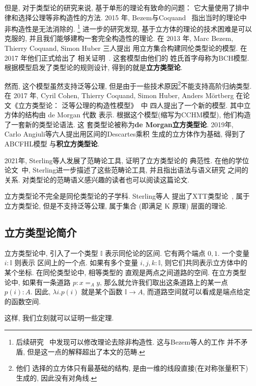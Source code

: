 但是, 对于类型论的研究来说, 基于单形的理论有致命的问题：
它大量使用了排中律和选择公理等非构造性的方法. 2015
年, Bezem与Coquand~\cite{bezem:2015:simplicial}
指出当时的理论中非构造性是无法消除的.%
\footnote{后续研究~\cite{henry:2019:constructive}
中发现可以修改理论去除非构造性. 这与Bezem等人的工作
并不矛盾, 但是这一点的解释超出了本文的范畴.}
进一步的研究发现, 基于立方体的理论的技术困难是可以克服的,
并且我们能够建构一套完全构造性的理论. 在 2013 年,
Marc Bezem, Thierry Coquand, Simon Huber 三人提出
用立方集合构建同伦类型论的模型. 在 2017 年他们正式给出了
相关证明~\cite{bch:2017:cubical}. 这套模型由他们的
姓氏首字母称为BCH模型. 根据模型启发了类型论的规则设计,
得到的就是\textbf{立方类型论}.

然而, 这个模型虽然支持泛等公理, 但是由于一些技术原因\footnote{他们
选择的立方体只有最基础的结构, 是由一维的线段直接(在对称张量积下)生成的,
因此没有对角线.}不能支持高阶归纳类型. 在 2017 年,
Cyril Cohen, Thierry Coquand, Simon Huber, Anders M\"ortberg
在论文《立方类型论： 泛等公理的构造性模型》~\cite{abcfhl:2021:cubical}中
四人提出了一个新的模型. 其中立方体的结构由 de Morgan 代数
表示. 根据这个模型(缩写为CCHM模型), 他们构造了一套新的类型论语法. 这
套类型论被称为\textbf{de Morgan立方类型论}.
2019年, Carlo Angiuli等六人提出用区间的Descartes乘积
生成的立方体作为基础, 得到了ABCFHL模型
与\textbf{积立方类型论}.

2021年, Sterling等人发展了范畴论工具, 证明了立方类型论的
典范性. 在他的学位论文~\cite{sterling:2021:thesis}中,
Sterling进一步描述了这些范畴论工具, 并且指出语法与语义研究
之间的关系. 对类型论的范畴语义感兴趣的读者也可以阅读这篇论文.

立方类型论不完全是同伦类型论的子学科. Sterling等人
提出了XTT类型论~\cite{sterling:2019:xtt}, 属于立方类型论,
但是不支持泛等公理, 属于集合 (即满足 K 原理) 层面的理论.

\subsection{立方类型论简介}

立方类型论中, 引入了一个类型 \(\mathbb I\) 表示同伦论的区间.
它有两个端点 \(0,1\). 一个变量 \(i : \mathbb I\) 则表示
区间上的一个点. 如果有多个变量 \(i,j,k : \mathbb I\),
则它们共同表示立方体中的某个坐标. 在同伦类型论中, 相等类型的
直观是两点之间道路的空间. 在立方类型论中, 如果有一条道路
\(p : x =_A y\), 那么就允许我们取出这条道路上的某一点
\(p(i) : A\). 因此, \(\lambda i. p(i)\) 就是某个函数
\(\mathbb I \to A\), 而道路空间就可以看成是端点给定的函数空间.

这样, 我们立刻就可以证明一些定理.

